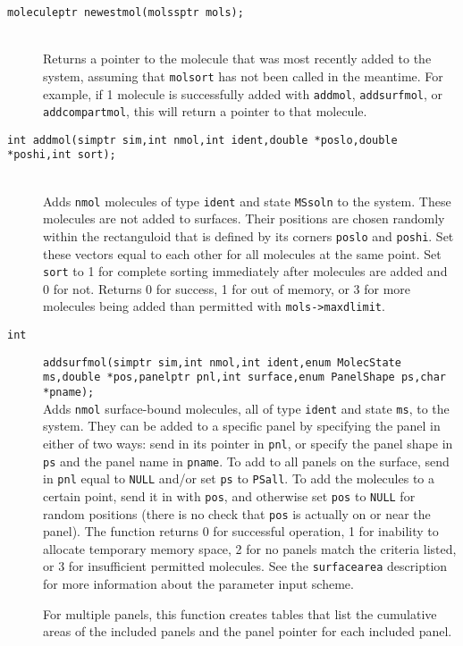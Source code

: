 \documentclass {book}
\begin{document}
\begin{description}
\item[\texttt{moleculeptr newestmol(molssptr mols);}]
\hfill \\
Returns a pointer to the molecule that was most recently added to the system, assuming that \texttt{molsort} has not been called in the meantime. For example, if 1 molecule is successfully added with \texttt{addmol}, \texttt{addsurfmol}, or \texttt{addcompartmol}, this will return a pointer to that molecule.

\item[\texttt{int addmol(simptr sim,int nmol,int ident,double *poslo,double *poshi,int sort);}]
\hfill \\
Adds \texttt{nmol} molecules of type \texttt{ident} and state \texttt{MSsoln} to the system. These molecules are not added to surfaces. Their positions are chosen randomly within the rectanguloid that is defined by its corners \texttt{poslo} and \texttt{poshi}. Set these vectors equal to each other for all molecules at the same point. Set \texttt{sort} to 1 for complete sorting immediately after molecules are added and 0 for not. Returns 0 for success, 1 for out of memory, or 3 for more molecules being added than permitted with \texttt{mols->maxdlimit}.

\item[\texttt{int}]
\texttt{addsurfmol(simptr sim,int nmol,int ident,enum MolecState ms,double *pos,panelptr pnl,int surface,enum PanelShape ps,char *pname);} \\
Adds \texttt{nmol} surface-bound molecules, all of type \texttt{ident} and state \texttt{ms}, to the system. They can be added to a specific panel by specifying the panel in either of two ways: send in its pointer in \texttt{pnl}, or specify the panel shape in \texttt{ps} and the panel name in \texttt{pname}. To add to all panels on the surface, send in \texttt{pnl} equal to \texttt{NULL} and/or set \texttt{ps} to \texttt{PSall}. To add the molecules to a certain point, send it in with \texttt{pos}, and otherwise set \texttt{pos} to \texttt{NULL} for random positions (there is no check that \texttt{pos} is actually on or near the panel). The function returns 0 for successful operation, 1 for inability to allocate temporary memory space, 2 for no panels match the criteria listed, or 3 for insufficient permitted molecules. See the \texttt{surfacearea} description for more information about the parameter input scheme.

For multiple panels, this function creates tables that list the cumulative areas of the included panels and the panel pointer for each included panel.


\end{description}
\end{document}
